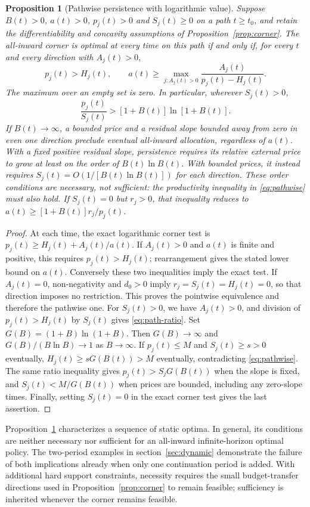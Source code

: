 \documentclass[11pt,a4paper]{article}
\newtheorem{proposition}{Proposition}
\theoremstyle{definition}\newtheorem{definition}{Definition}
\begin{document}
\begin{proposition}[Pathwise persistence with logarithmic value]
\label{prop:persistence}
Suppose $B(t)>0$, $a(t)>0$, $p_j(t)>0$ and $S_j(t)\geq0$ on a
path $t\geq t_0$, and retain the differentiability and concavity assumptions
of Proposition~\ref{prop:corner}. The all-inward corner is optimal at every
time on this path if and only if, for every $t$ and every direction with
$A_j(t)>0$,
\begin{equation}
 p_j(t)>H_j(t),\qquad
 a(t)\geq \max_{j:A_j(t)>0}
 \frac{A_j(t)}{p_j(t)-H_j(t)}.
 \label{eq:pathwise}
\end{equation}
The maximum over an empty set is zero. In particular, wherever $S_j(t)>0$,
\begin{equation}
 \frac{p_j(t)}{S_j(t)}>[1+B(t)]\ln[1+B(t)].
 \label{eq:path-ratio}
\end{equation}
If $B(t)\to\infty$, a bounded price and a residual slope bounded away
from zero in even one direction preclude eventual all-inward allocation,
regardless of $a(t)$. With a fixed positive residual slope, persistence
requires its relative external price to grow at least on the order of
$B(t)\ln B(t)$. With bounded prices, it instead requires
$S_j(t)=O(1/[B(t)\ln B(t)])$ for each direction. These order conditions
are necessary, not sufficient: the productivity inequality in
\eqref{eq:pathwise} must also hold. If $S_j(t)=0$ but $r_j>0$, that
inequality reduces to $a(t)\geq[1+B(t)]r_j/p_j(t)$.
\end{proposition}
\begin{proof}
At each time, the exact logarithmic corner test is
$p_j(t)\geq H_j(t)+A_j(t)/a(t)$. If $A_j(t)>0$ and $a(t)$ is
finite and positive, this requires $p_j(t)>H_j(t)$; rearrangement gives
the stated lower bound on $a(t)$. Conversely these two inequalities imply
the exact test. If $A_j(t)=0$, non-negativity and $d_0>0$ imply
$r_j=S_j(t)=H_j(t)=0$, so that direction imposes no restriction.
This proves the pointwise equivalence and therefore the pathwise one.
For $S_j(t)>0$, we have $A_j(t)>0$, and division of $p_j(t)>H_j(t)$
by $S_j(t)$ gives \eqref{eq:path-ratio}. Set
$G(B)=(1+B)\ln(1+B)$. Then $G(B)\to\infty$ and
$G(B)/(B\ln B)\to1$ as $B\to\infty$. If $p_j(t)\leq M$ and
$S_j(t)\geq s>0$ eventually, $H_j(t)\geq sG(B(t))>M$ eventually,
contradicting \eqref{eq:pathwise}. The same ratio inequality gives
$p_j(t)>S_jG(B(t))$ when the slope is fixed, and
$S_j(t)<M/G(B(t))$ when prices are bounded, including any zero-slope
times. Finally, setting $S_j(t)=0$ in the exact corner test gives the
last assertion.
\end{proof}
Proposition~\ref{prop:persistence} characterizes a sequence of static
optima. In general, its conditions are neither necessary nor sufficient
for an all-inward infinite-horizon optimal policy. The two-period examples in
section~\ref{sec:dynamic} demonstrate the failure of both implications
already when only one continuation period is added.
With additional hard support constraints, necessity requires the small
budget-transfer directions used in Proposition~\ref{prop:corner} to remain
feasible; sufficiency is inherited whenever the corner remains feasible.
\end{document}
